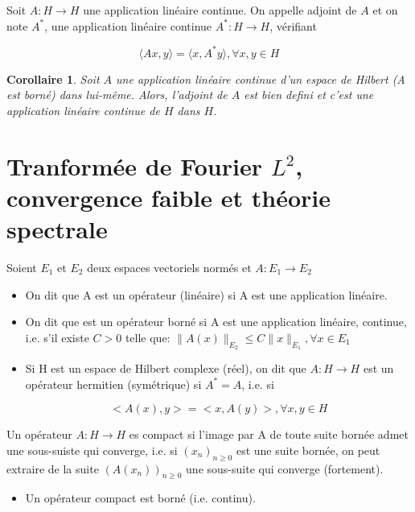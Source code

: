 \documentclass[10pt,a4paper,oneside]{article}
\newtheorem{corollaire}{Corollaire}
\newenvironment{definition}[1][Definition]{\begin{trivlist}
\item[\hskip \labelsep {\bfseries #1}]}{\end{trivlist}}
\begin{document}
\begin{definition}
Soit $A:H \rightarrow H$ une application linéaire continue. On appelle adjoint de $A$ et on note $A^*$, une application linéaire continue $A^*:H \rightarrow H$, vérifiant

\[ \langle Ax,y \rangle = \langle x,A^*y \rangle , \forall x,y \in H \]

\end{definition}


\begin{corollaire}
Soit $A$ une application linéaire continue d'un espace de Hilbert (A est borné) dans lui-même. Alors, l'adjoint de $A$ est bien defini et c'est une application linéaire continue de $H$ dans $H$.
\end{corollaire}


\section{Tranformée de Fourier $L^2$, convergence faible et théorie spectrale}


\begin{definition}

\item
Soient $E_1$ et $E_2$ deux espaces vectoriels normés et $A: E_1 \rightarrow E_2$

\begin{itemize}

\item
On dit que A est un opérateur (linéaire) si A est une application linéaire.

\item

On dit que est un opérateur borné si A est une application linéaire, continue, i.e. s'il existe $C > 0$ telle que: $\|A(x)\|_{E_2} \leq C \|x\|_{E_1}, \forall x \in E_1$

\item
Si H est un espace de Hilbert complexe (réel), on dit que $A: H \rightarrow H$ est un opérateur hermitien (symétrique) si $A^* = A$, i.e. si

\[ <A(x),y> = <x,A(y)>, \forall x,y \in H \]

\end{itemize}

\end{definition}


\begin{definition}
Un opérateur $A: H \rightarrow H$ es compact si l'image par A de toute suite bornée admet une sous-suiste qui converge, i.e. si $(x_n)_{n\geq0}$ est une suite bornée, on peut extraire de la suite $(A(x_n))_{n\geq0}$ une sous-suite qui converge (fortement).

\begin{itemize}
\item
Un opérateur compact est borné (i.e. continu).
\end{itemize}

\end{definition}
\end{document}
